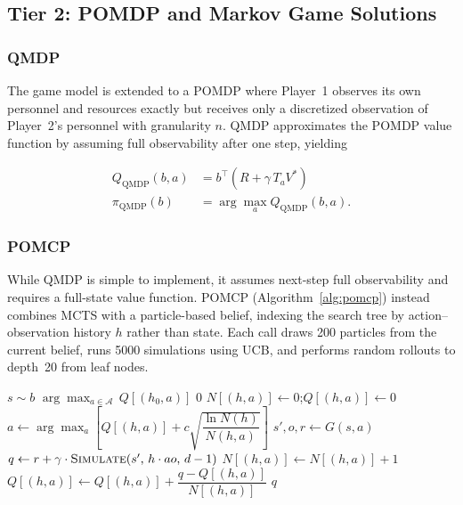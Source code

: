 \documentclass[conference]{IEEEtran}
\begin{document}
\subsection{Tier 2: POMDP and Markov Game Solutions}
\subsubsection{QMDP}

The game model is extended to a POMDP where Player~1 observes its own personnel and
resources exactly but receives only a discretized observation of Player~2's personnel
with granularity $n$. QMDP approximates the POMDP value function by assuming full
observability after one step, yielding

\begin{align}
  Q_{\text{QMDP}}(b, a) &= b^{\!\top}\!\left(R + \gamma\, T_a V^*\right)\\
  \pi_{\text{QMDP}}(b) &= \arg\max_a Q_{\text{QMDP}}(b, a).
\end{align}

\subsubsection{POMCP}

While QMDP is simple to implement, it assumes next-step full observability and requires
a full-state value function. POMCP (Algorithm~\ref{alg:pomcp}) instead combines MCTS
with a particle-based belief, indexing the search tree by action--observation history
$h$ rather than state. Each call draws 200 particles from the current belief, runs
5000 simulations using UCB, and performs random rollouts to depth~20 from leaf nodes.

\begin{algorithm}
\caption{POMCP \cite{kochenderfer2022algorithms}}
\label{alg:pomcp}
\begin{algorithmic}[1]
    \State $s \sim b$ 
    \State {}
  \EndFor
  \State \Return $\arg\max_{a \in \mathcal{A}}\, Q[(h_0, a)]$
\EndFunction
\Statex
{}
    \State \Return $0$
  \EndIf
      \State $N[(h,a)] \gets 0$;\quad $Q[(h,a)] \gets 0$
    \EndFor
    \State \Return {} 
  \EndIf
  \State $a \gets \arg\max_{a}\!\left[Q[(h,a)] + c\sqrt{\dfrac{\ln N(h)}{N(h,a)}}\right]$
  \State $s', o, r \gets G(s, a)$ 
  \State $q \gets r + \gamma \cdot \Call{Simulate}{s',\, h \cdot ao,\, d-1}$
  \State $N[(h,a)] \gets N[(h,a)] + 1$
  \State $Q[(h,a)] \gets Q[(h,a)] + \dfrac{q - Q[(h,a)]}{N[(h,a)]}$
  \State \Return $q$
\EndFunction
\end{algorithmic}
\end{algorithm}
\end{document}
